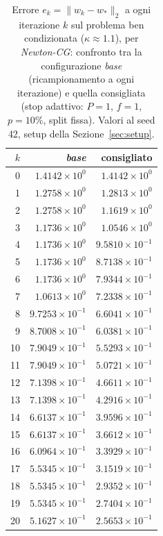 \begin{table}[H]
\centering
\footnotesize
\renewcommand{\arraystretch}{0.85}
\setlength{\tabcolsep}{8pt}
\caption{Errore $e_k=\|w_k-w_*\|_2$ a ogni iterazione $k$ sul problema ben condizionata ($\kappa\approx 1.1$), per \emph{Newton-CG}: confronto tra la configurazione \emph{base} (ricampionamento a ogni iterazione) e quella consigliata (stop adattivo: $P{=}1$, $f{=}1$, $p{=}10\%$, split fissa). Valori al seed 42, setup della Sezione~\ref{sec:setup}.}
\label{tab:riuso_cons_bencond_ncg}
\begin{tabular}{@{}rrr@{}}
\toprule
$k$ & \emph{base} & consigliato\\
\midrule
0 & $1.4142\times10^{0}$ & $1.4142\times10^{0}$\\
1 & $1.2758\times10^{0}$ & $1.2813\times10^{0}$\\
2 & $1.2758\times10^{0}$ & $1.1619\times10^{0}$\\
3 & $1.1736\times10^{0}$ & $1.0546\times10^{0}$\\
4 & $1.1736\times10^{0}$ & $9.5810\times10^{-1}$\\
5 & $1.1736\times10^{0}$ & $8.7138\times10^{-1}$\\
6 & $1.1736\times10^{0}$ & $7.9344\times10^{-1}$\\
7 & $1.0613\times10^{0}$ & $7.2338\times10^{-1}$\\
8 & $9.7253\times10^{-1}$ & $6.6041\times10^{-1}$\\
9 & $8.7008\times10^{-1}$ & $6.0381\times10^{-1}$\\
10 & $7.9049\times10^{-1}$ & $5.5293\times10^{-1}$\\
11 & $7.9049\times10^{-1}$ & $5.0721\times10^{-1}$\\
12 & $7.1398\times10^{-1}$ & $4.6611\times10^{-1}$\\
13 & $7.1398\times10^{-1}$ & $4.2916\times10^{-1}$\\
14 & $6.6137\times10^{-1}$ & $3.9596\times10^{-1}$\\
15 & $6.6137\times10^{-1}$ & $3.6612\times10^{-1}$\\
16 & $6.0964\times10^{-1}$ & $3.3929\times10^{-1}$\\
17 & $5.5345\times10^{-1}$ & $3.1519\times10^{-1}$\\
18 & $5.5345\times10^{-1}$ & $2.9352\times10^{-1}$\\
19 & $5.5345\times10^{-1}$ & $2.7404\times10^{-1}$\\
20 & $5.1627\times10^{-1}$ & $2.5653\times10^{-1}$\\

\end{tabular}
\end{table}
